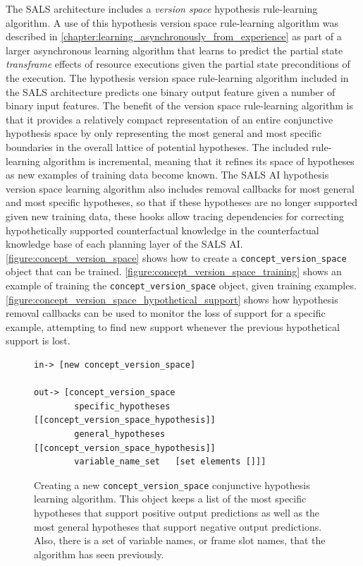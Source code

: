 The SALS architecture includes a {\emph{version space}}
\cite[]{mitchell:1997} hypothesis rule-learning algorithm.  A use of
this hypothesis version space rule-learning algorithm was described in
{\mbox{\autoref{chapter:learning_asynchronously_from_experience}}} as
part of a larger asynchronous learning algorithm that learns to
predict the partial state {\emph{transframe}} \cite[]{minsky:1975}
effects of resource executions given the partial state preconditions
of the execution.  The hypothesis version space rule-learning
algorithm included in the SALS architecture predicts one binary output
feature given a number of binary input features.  The benefit of the
version space rule-learning algorithm is that it provides a relatively
compact representation of an entire conjunctive hypothesis space by
only representing the most general and most specific boundaries in the
overall lattice of potential hypotheses.  The included rule-learning
algorithm is incremental, meaning that it refines its space of
hypotheses as new examples of training data become known.  The SALS AI
hypothesis version space learning algorithm also includes removal
callbacks for most general and most specific hypotheses, so that if
these hypotheses are no longer supported given new training data,
these hooks allow tracing dependencies for correcting hypothetically
supported counterfactual knowledge in the counterfactual knowledge
base of each planning layer of the SALS AI.
{\mbox{\autoref{figure:concept_version_space}}} shows how to create a
{\tt{concept\_version\_space}} object that can be trained.
{\mbox{\autoref{figure:concept_version_space_training}}} shows an
example of training the {\tt{concept\_version\_space}} object, given
training examples.
{\mbox{\autoref{figure:concept_version_space_hypothetical_support}}}
shows how hypothesis removal callbacks can be used to monitor the loss
of support for a specific example, attempting to find new support
whenever the previous hypothetical support is lost.
\begin{figure}[h]
\centering
{\scriptsize
\begin{Verbatim}[frame=single]
 in-> [new concept_version_space]

out-> [concept_version_space
        specific_hypotheses [[concept_version_space_hypothesis]]
        general_hypotheses  [[concept_version_space_hypothesis]]
        variable_name_set   [set elements []]]
\end{Verbatim}
}
\caption[Creating a new {\tt{concept\_version\_space}} conjunctive
  hypothesis learning algorithm.]{Creating a new
  {\tt{concept\_version\_space}} conjunctive hypothesis learning
  algorithm.  This object keeps a list of the most specific hypotheses
  that support positive output predictions as well as the most general
  hypotheses that support negative output predictions.  Also, there is
  a set of variable names, or frame slot names, that the algorithm has
  seen previously.}
\label{figure:concept_version_space}
\end{figure}

